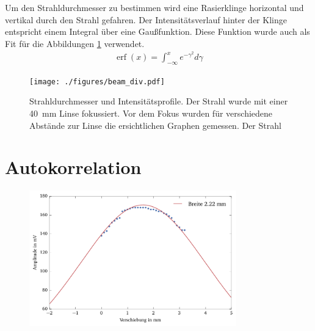 \documentclass[11pt,twoside=true]{scrartcl}
\begin{document}
Um den Strahldurchmesser zu bestimmen wird eine Rasierklinge horizontal und
vertikal durch den Strahl gefahren. Der Intensitätsverlauf hinter der Klinge
entspricht einem Integral über eine Gaußfunktion. Diese Funktion wurde auch
als Fit für die Abbildungen \ref{fig:beam_div} verwendet.
%
\begin{align*}
  \operatorname{erf}(x) = \int_{-\infty}^{x} e^{-\gamma^2} d\gamma
\end{align*}
%


\begin{figure}[H]
  \centering
  \texttt{[image: ./figures/beam\_div.pdf]}
  \caption{Strahldurchmesser und Intensitätsprofile. Der Strahl wurde mit einer
  \SI{40}{\milli\metre} Linse fokussiert. Vor dem Fokus wurden für verschiedene 
  Abstände zur Linse die ersichtlichen Graphen gemessen. Der Strahl}
  \label{fig:beam_div}
\end{figure}








\section{Autokorrelation}
\begin{figure}[H]
  \centering
  \includegraphics[width=0.8\textwidth]{./figures/autokorr_breite.pdf}
  \caption{}
  \label{fig:autokorr_breite}
\end{figure}
\end{document}
